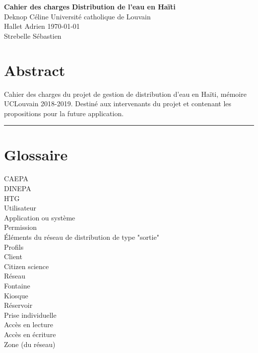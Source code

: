 \documentclass[a4paper, 11pt]{article}
\begin{document}
\noindent
\large\textbf{Cahier des charges} \hfill \textbf{Distribution de l'eau en Haïti} \\
\normalsize Deknop Céline \hfill Université catholique de Louvain \\
Hallet Adrien \hfill \today \\
Strebelle Sébastien

\section*{Abstract}
Cahier des charges du projet de gestion de distribution d'eau en Haïti, mémoire UCLouvain 2018-2019. Destiné aux intervenants du projet et contenant les propositions pour la future application.
\hrule
\section{Glossaire}
  \begin{description} %
    \item[CAEPA]
    \item[DINEPA]
    \item[HTG]
    \item[Utilisateur]
    \item[Application ou système]
    \item[Permission]
    \item[Éléments du réseau de distribution de type "sortie"] %
    \item[Profils]
    \item[Client]
    \item[Citizen science]
    \item[Réseau]
    \item[Fontaine]
    \item[Kiosque]
    \item[Réservoir]
    \item[Prise individuelle]
    \item[Accès en lecture]
    \item[Accès en écriture]
    \item[Zone (du réseau)]
  \end{description}
\end{document}
